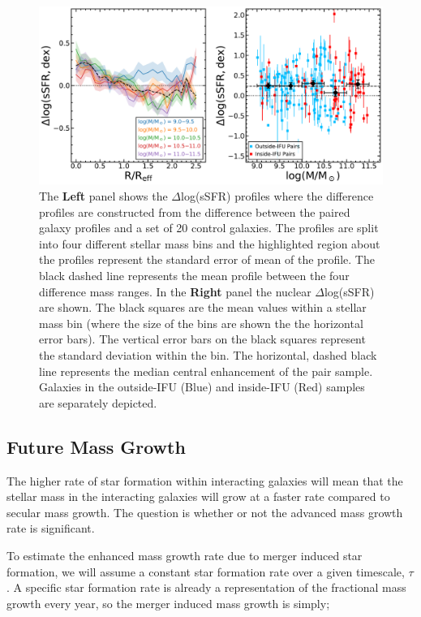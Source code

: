\documentclass[iop,revtex4,twocolumn,apj,numberedappendix,appendixfloats]{emulateapj}
\begin{document}
\begin{figure}
\centering
\includegraphics[width=\linewidth]{fig/ssfr_mass.pdf}
\caption[]{The \textbf{Left} panel shows the $\Delta$log(sSFR) profiles where the difference profiles are constructed from the difference between the paired galaxy profiles and a set of 20 control galaxies. The profiles are split into four different stellar mass bins and the highlighted region about the profiles represent the standard error of mean of the profile. The black dashed line represents the mean profile between the four difference mass ranges. In the \textbf{Right} panel the nuclear $\Delta$log(sSFR) are shown. The black squares are the mean values within a stellar mass bin (where the size of the bins are shown the the horizontal error bars). The vertical error bars on the black squares represent the standard deviation within the bin. The horizontal, dashed black line represents the median central enhancement of the pair sample. Galaxies in the outside-IFU (Blue) and inside-IFU (Red) samples are separately depicted.}
\label{fig:ssfr_mass}
\end{figure}

\subsection{Future Mass Growth}

The higher rate of star formation within interacting galaxies will mean that the stellar mass in the interacting galaxies will grow at a faster rate compared to secular mass growth. The question is whether or not the advanced mass growth rate is significant. 

To estimate the enhanced mass growth rate due to merger induced star formation, we will assume a constant star formation rate over a given timescale, $\tau$. A specific star formation rate is already a representation of the fractional mass growth every year, so the merger induced mass growth is simply;
\end{document}
